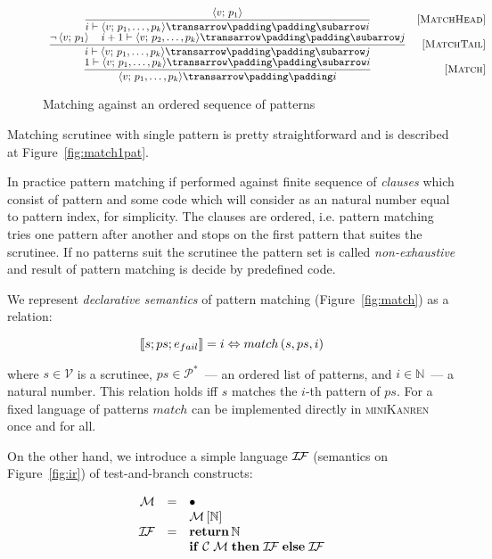 \begin{figure}
   \renewcommand*{\arraystretch}{3}
   \setarrow{\xRightarrow}
   \setsubarrow{_*}
   \[
   \begin{array}{cr}
     \trule{\inbr{v;\,p_1}}
           {\withenv{i}{\trans{\inbr{v;\,p_1,\dots,p_k}}{}{i}}} & \ruleno{MatchHead}\\
     \trule{\neg\inbr{v;\,p_1}\quad\withenv{i+1}{\trans{\inbr{v;\,p_2,\dots,p_k}}{}{j}}}
           {\withenv{i}{\trans{\inbr{v;\,p_1,\dots,p_k}}{}{j}}} & \ruleno{MatchTail}\\
     \trule{\withenv{1}{\trans{\inbr{v;\,p_1,\dots,p_k}}{}{i}}}
           {\setsubarrow{}\trans{\inbr{v;\,p_1,\dots,p_k}}{}{i}} & \ruleno{Match}
   \end{array}
   \]
   \caption{Matching against an ordered sequence of patterns}
   \label{fig:matchpatts}
\end{figure}

Matching scrutinee with single pattern is pretty straightforward and is described at Figure~\ref{fig:match1pat}.

In practice pattern matching if performed against finite sequence of \emph{clauses} which consist of pattern and some code which will consider as an natural number equal to pattern index, for simplicity. The clauses are ordered, i.e. pattern matching tries one pattern after another and stops on the first pattern that suites the scrutinee. If no patterns suit the scrutinee the pattern set is called \emph{non-exhaustive} and result of pattern matching is decide by predefined code.   
 

We represent \emph{declarative semantics} of pattern matching (Figure~\ref{fig:match}) as a relation:
 
 \[
  \llbracket{s; ps; e_{fail}}\rrbracket = i \Leftrightarrow   match\, (s, ps, i)
 \]
 
 where $s\in\mathcal{V}$ is a scrutinee, $ps\in\mathcal{P}^*$~--- an ordered list of patterns, and $i\in\mathbb{N}$~--- a natural number.
 This relation holds iff $s$ matches the $i$-th pattern of $ps$. For a fixed language of patterns $match$ can be implemented directly
 in \textsc{miniKanren} once and for all.
 
 On the other hand, we introduce a simple language $\mathcal{I\!F}$ (semantics on Figure~\ref{fig:ir}) of test-and-branch constructs:
 
 \[
 \begin{array}{rcl}
   \mathcal M & = & \bullet \\
              &   & \mathcal M\,[\mathbb{N}] \\
   \mathcal{I\!F} & = & \mathbf{return}\,\mathbb{N} \\
              &   & \mathbf{if}\;\mathcal{C}\;\mathcal{M}\;\mathbf{then}\;\mathcal{I\!F}\;\mathbf{else}\;\mathcal{I\!F}
 \end{array}
 \]
 
